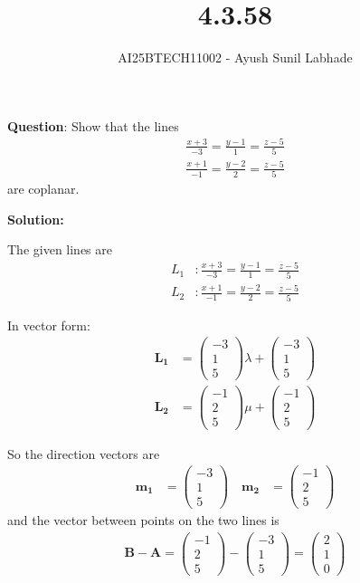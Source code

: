 \documentclass{beamer}
\theoremstyle{remark}
\newcommand{\myvec}[1]{\ensuremath{\begin{pmatrix}#1\end{pmatrix}}}
\let\vec\mathbf
\numberwithin{equation}{section}
\begin{document}
\title{4.3.58}
\author{AI25BTECH11002 - Ayush Sunil Labhade}
{\let\newpage\relax\maketitle}

\textbf{Question}:
		Show that the lines
		\begin{align}
\frac{x+3}{-3}=\frac{y-1}{1}=\frac{z-5}{5}
		\end{align}
		\begin{align}
		\frac{x+1}{-1}=\frac{y-2}{2}=\frac{z-5}{5}
		\end{align}
are coplanar.
	


\textbf{Solution:}

The given lines are
\begin{align}
L_1 &: \frac{x+3}{-3}=\frac{y-1}{1}=\frac{z-5}{5} \\
L_2 &: \frac{x+1}{-1}=\frac{y-2}{2}=\frac{z-5}{5}
\end{align}

In vector form:
\begin{align}
\vec{L_1} &= \myvec{-3 \\ 1 \\ 5}\lambda + \myvec{-3 \\ 1 \\ 5} \\
\vec{L_2} &= \myvec{-1 \\ 2 \\ 5}\mu + \myvec{-1 \\ 2 \\ 5}
\end{align}

So the direction vectors are
\begin{align}
	\vec{m_1} &= \myvec{-3 \\ 1 \\ 5} \quad 
	\vec{m_2} &= \myvec{-1 \\ 2 \\ 5}
\end{align}
and the vector between points on the two lines is
\begin{align}
\vec{B}-\vec{A} = \myvec{-1 \\ 2 \\ 5} - \myvec{-3 \\ 1 \\ 5} = \myvec{2 \\ 1 \\ 0}
\end{align}
\end{document}
